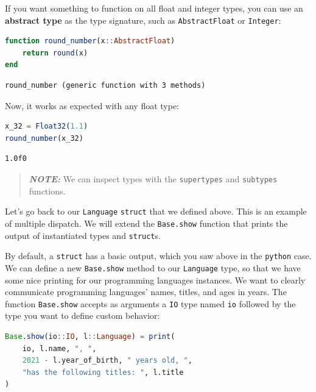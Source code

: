 \documentclass[
  notoc %
]{tufte-book}
\newcommand{\passthrough}[1]{#1}
\begin{document}
If you want something to function on all float and integer types, you
can use an \textbf{abstract type} as the type signature, such as
\passthrough{\lstinline!AbstractFloat!} or
\passthrough{\lstinline!Integer!}:

\begin{lstlisting}[language=Julia]
function round_number(x::AbstractFloat)
    return round(x)
end
\end{lstlisting}

\begin{lstlisting}[language=Output]
round_number (generic function with 3 methods)
\end{lstlisting}

Now, it works as expected with any float type:

\begin{lstlisting}[language=Julia]
x_32 = Float32(1.1)
round_number(x_32)
\end{lstlisting}

\begin{lstlisting}[language=Output]
1.0f0
\end{lstlisting}

\begin{quote}
\textbf{\emph{NOTE:}} We can inspect types with the
\passthrough{\lstinline!supertypes!} and
\passthrough{\lstinline!subtypes!} functions.
\end{quote}

Let's go back to our \passthrough{\lstinline!Language!}
\passthrough{\lstinline!struct!} that we defined above. This is an
example of multiple dispatch. We will extend the
\passthrough{\lstinline!Base.show!} function that prints the output of
instantiated types and \passthrough{\lstinline!struct!}s.

By default, a \passthrough{\lstinline!struct!} has a basic output, which
you saw above in the \passthrough{\lstinline!python!} case. We can
define a new \passthrough{\lstinline!Base.show!} method to our
\passthrough{\lstinline!Language!} type, so that we have some nice
printing for our programming languages instances. We want to clearly
communicate programming languages' names, titles, and ages in years. The
function \passthrough{\lstinline!Base.show!} accepts as arguments a
\passthrough{\lstinline!IO!} type named \passthrough{\lstinline!io!}
followed by the type you want to define custom behavior:

\begin{lstlisting}[language=Julia]
Base.show(io::IO, l::Language) = print(
    io, l.name, ", ",
    2021 - l.year_of_birth, " years old, ",
    "has the following titles: ", l.title
)
\end{lstlisting}
\end{document}
